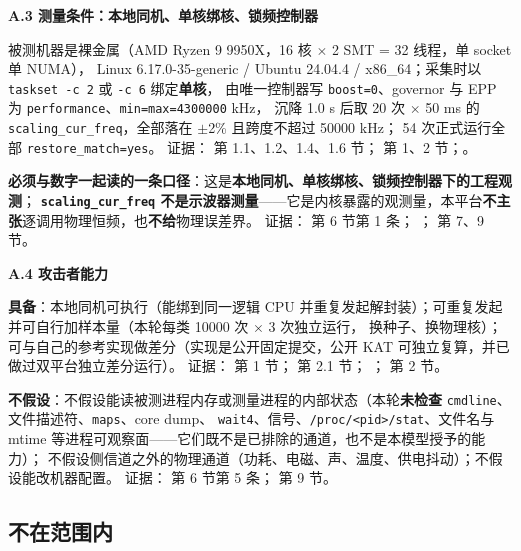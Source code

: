 \noindent\textbf{A.3 测量条件：本地同机、单核绑核、锁频控制器}\par
被测机器是裸金属（AMD Ryzen 9 9950X，16 核 $\times$ 2 SMT = 32 线程，单 socket 单 NUMA），
Linux 6.17.0-35-generic / Ubuntu 24.04.4 / x86\_64；采集时以 \texttt{taskset -c 2} 或 \texttt{-c 6} 绑定\textbf{单核}，
由唯一控制器写 \texttt{boost=0}、governor 与 EPP 为 \texttt{performance}、\texttt{min=max=4300000} kHz，
沉降 1.0 s 后取 20 次 $\times$ 50 ms 的 \texttt{scaling\_cur\_freq}，全部落在 $\pm$2\% 且跨度不超过 50000 kHz；
54 次正式运行全部 \texttt{restore\_match=yes}。
证据： 第 1.1、1.2、1.4、1.6 节；
\texttt{} 第 1、2 节；。\par
\textbf{必须与数字一起读的一条口径}：这是\textbf{本地同机、单核绑核、锁频控制器下的工程观测}；
\textbf{\texttt{scaling\_cur\_freq} 不是示波器测量}——它是内核暴露的观测量，本平台\textbf{不主张}逐调用物理恒频，也\textbf{不给}物理误差界。
证据：\texttt{} 第 6 节第 1 条；
；
 第 7、9 节。

\noindent\textbf{A.4 攻击者能力}\par
\textbf{具备}：本地同机可执行（能绑到同一逻辑 CPU 并重复发起解封装）；可重复发起并可自行加样本量（本轮每类 10000 次 $\times$ 3 次独立运行，
换种子、换物理核）；可与自己的参考实现做差分（实现是公开固定提交，公开 KAT 可独立复算，并已做过双平台独立差分运行）。
证据： 第 1 节；\texttt{} 第 2.1 节；
； 第 2 节。\par
\textbf{不假设}：不假设能读被测进程内存或测量进程的内部状态（本轮\textbf{未检查} \texttt{cmdline}、文件描述符、\texttt{maps}、core dump、
\texttt{wait4}、信号、\texttt{/proc/<pid>/stat}、文件名与 mtime 等进程可观察面——它们既不是已排除的通道，也不是本模型授予的能力）；
不假设侧信道之外的物理通道（功耗、电磁、声、温度、供电抖动）；不假设能改机器配置。
证据： 第 6 节第 5 条； 第 9 节。

\subsection{不在范围内}

